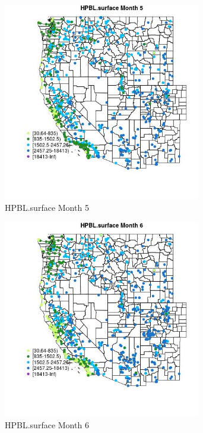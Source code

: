 \begin{figure} 
\centering  
\includegraphics[width=0.77\textwidth]{Code_Outputs/Report_ML_input_PM25_Step4_part_f_de_duplicated_aveswNAs_MapObsMo5HPBLsurface.jpg} 
\caption{\label{fig:Report_ML_input_PM25_Step4_part_f_de_duplicated_aveswNAsMapObsMo5HPBLsurface}HPBL.surface Month 5} 
\end{figure} 
 

\begin{figure} 
\centering  
\includegraphics[width=0.77\textwidth]{Code_Outputs/Report_ML_input_PM25_Step4_part_f_de_duplicated_aveswNAs_MapObsMo6HPBLsurface.jpg} 
\caption{\label{fig:Report_ML_input_PM25_Step4_part_f_de_duplicated_aveswNAsMapObsMo6HPBLsurface}HPBL.surface Month 6} 
\end{figure} 
 

